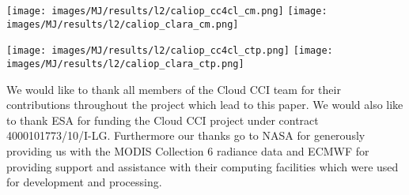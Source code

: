 \documentclass[amt]{style/copernicus}
\begin{document}
\begin{center}
\texttt{[image: images/MJ/results/l2/caliop\_cc4cl\_cm.png]}
\texttt{[image: images/MJ/results/l2/caliop\_clara\_cm.png]}
\end{center}

\begin{center}
\texttt{[image: images/MJ/results/l2/caliop\_cc4cl\_ctp.png]}
\texttt{[image: images/MJ/results/l2/caliop\_clara\_ctp.png]}
\end{center}

\label{conclusion}

\begin{acknowledgements}
We would like to thank all members of the Cloud CCI team for their contributions throughout the project which lead to this paper. We would also like to thank ESA for funding the Cloud CCI project under contract 4000101773/10/I-LG. Furthermore our thanks go to NASA for generously providing us with the MODIS Collection 6 radiance data and ECMWF for providing support and assistance with their computing facilities which were used for development and processing.
\end{acknowledgements}

















\end{document}
